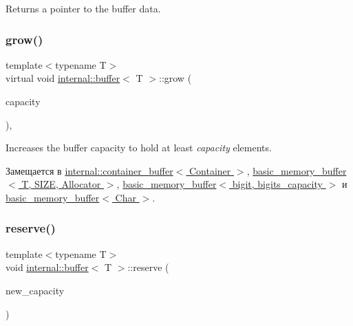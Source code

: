 Returns a pointer to the buffer data. \mbox{\label{classinternal_1_1buffer_a38f53be20945474be4f60b58b9b4cc54}} 
\subsubsection{\texorpdfstring{grow()}{grow()}}
{\footnotesize\ttfamily template$<$typename T$>$ \\
virtual void \hyperlink{classinternal_1_1buffer}{internal\+::buffer}$<$ T $>$\+::grow (\begin{DoxyParamCaption}\item[{std\+::size\+\_\+t}]{capacity }\end{DoxyParamCaption})\hspace{0.3cm}{\ttfamily [protected]}, {}}

Increases the buffer capacity to hold at least {\itshape capacity} elements. 

Замещается в \hyperlink{classinternal_1_1container__buffer_a9dc9c633e12053ddf07af13b30b378b3}{internal\+::container\+\_\+buffer$<$ Container $>$}, \hyperlink{classbasic__memory__buffer_a2f01489b9805a99cdc93ab0aee6730eb}{basic\+\_\+memory\+\_\+buffer$<$ T, S\+I\+Z\+E, Allocator $>$}, \hyperlink{classbasic__memory__buffer_a2f01489b9805a99cdc93ab0aee6730eb}{basic\+\_\+memory\+\_\+buffer$<$ bigit, bigits\+\_\+capacity $>$} и \hyperlink{classbasic__memory__buffer_a2f01489b9805a99cdc93ab0aee6730eb}{basic\+\_\+memory\+\_\+buffer$<$ Char $>$}.

\mbox{\label{classinternal_1_1buffer_a6aa946f91c0aeb68f06d3889ba9d5b48}} 
\subsubsection{\texorpdfstring{reserve()}{reserve()}}
{\footnotesize\ttfamily template$<$typename T$>$ \\
void \hyperlink{classinternal_1_1buffer}{internal\+::buffer}$<$ T $>$\+::reserve (\begin{DoxyParamCaption}\item[{std\+::size\+\_\+t}]{new\+\_\+capacity }\end{DoxyParamCaption})\hspace{0.3cm}{\ttfamily [inline]}}

